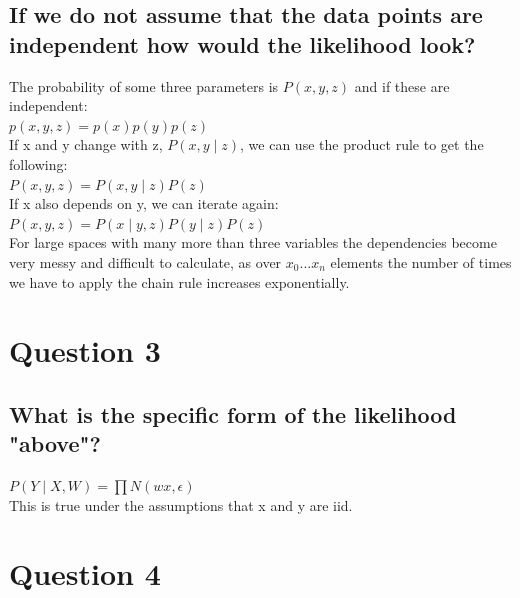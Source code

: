 \documentclass[a4paper, 9pt]{article}
\begin{document}
\subsection*{If we do not assume that the data points are independent how would the likelihood look?}
The probability of some three parameters is \( P(x,y,z) \) and if these are independent: \\
\newline
\( p(x,y,z)=p(x)p(y)p(z) \) \\
\newline
If x and y change with z, \( P(x,y \mid z) \), we can use the product rule to get the following: \\
\newline
\( P(x,y,z) = P (x,y \mid z)P(z) \) \\
\newline
If x also depends on y, we can iterate again: \\
\newline
 \( P(x,y,z) = P(x \mid y,z)P(y \mid z)P(z) \) \\
 \newline
For large spaces with many more than three variables the dependencies become very messy and difficult to calculate, as over \( x_{0}...x_{n} \) elements  the number of times we have to apply the chain rule increases exponentially.

\section*{Question 3}
\subsection*{What is the specific form of the likelihood "above"?}
\( P( Y \mid X, W) = \prod N(wx, \epsilon) \) \\
This is true under the assumptions that x and y are iid.

\section*{Question 4}
\end{document}
